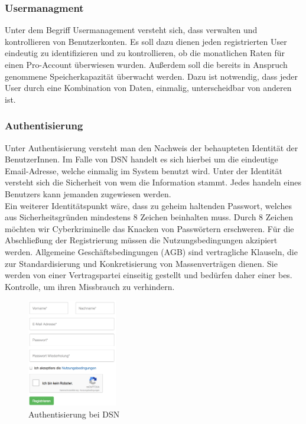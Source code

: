 
\subsubsection{Usermanagment}
Unter dem Begriff Usermanagement versteht sich, dass verwalten und kontrollieren von Benutzerkonten. Es soll dazu dienen jeden registrierten User eindeutig zu identifizieren und zu kontrollieren, ob die monatlichen Raten für einen Pro-Account überwiesen wurden. Außerdem soll die bereits in Anspruch genommene Speicherkapazität überwacht werden. Dazu ist notwendig, dass jeder User durch eine Kombination von Daten, einmalig, unterscheidbar von anderen ist.
\subsubsection{Authentisierung}
Unter Authentisierung versteht man den Nachweis der behaupteten Identität der BenutzerInnen. Im Falle von DSN handelt es sich hierbei um die eindeutige Email-Adresse, welche einmalig im System benutzt wird. Unter der Identität versteht sich die Sicherheit von wem die Information stammt. Jedes handeln eines Benutzers kann jemanden zugewiesen werden.\\
Ein weiterer Identitätspunkt wäre, dass zu geheim haltenden Passwort, welches aus Sicherheitsgründen mindestens 8 Zeichen beinhalten muss. Durch 8 Zeichen möchten wir Cyberkriminelle das Knacken von Passwörtern erschweren. Für die Abschließung der Registrierung müssen die Nutzungsbedingungen akzipiert werden. \grqq{}Allgemeine Geschäftsbedingungen (AGB) sind vertragliche Klauseln, die zur Standardisierung und Konkretisierung von Massenverträgen dienen. Sie werden von einer Vertragspartei einseitig gestellt und bedürfen daher einer bes. Kontrolle, um ihren Missbrauch zu verhindern.\grqq{}\cite{AGB}\\
\cite{VERTEILTE_SYSTEME}\cite{PASSWORT_SCHUTZ}

\begin{figure}[ht]
\includegraphics[width=0.35\textwidth]{images/usermanagement/Registrierung}
	\caption{Authentisierung bei DSN}
	\label{fig1}
\end{figure}

